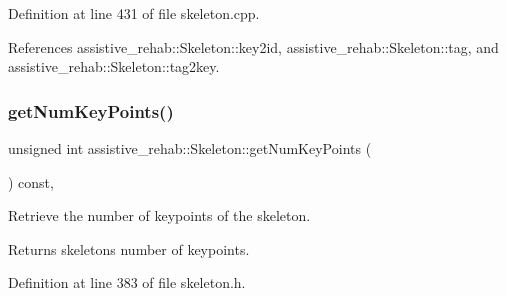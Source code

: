 Definition at line 431 of file skeleton.\+cpp.


\begin{DoxyCode}{0}

\end{DoxyCode}


References assistive\+\_\+rehab\+::\+Skeleton\+::key2id, assistive\+\_\+rehab\+::\+Skeleton\+::tag, and assistive\+\_\+rehab\+::\+Skeleton\+::tag2key.

\mbox{\label{classassistive__rehab_1_1Skeleton_ac5e5b98f2c9178f6e0def5033e27922f}} 
\subsubsection{\texorpdfstring{getNumKeyPoints()}{getNumKeyPoints()}}
{\footnotesize\ttfamily unsigned int assistive\+\_\+rehab\+::\+Skeleton\+::get\+Num\+Key\+Points (\begin{DoxyParamCaption}{ }\end{DoxyParamCaption}) const\hspace{0.3cm}{\ttfamily [inline]}, {\ttfamily [inherited]}}



Retrieve the number of keypoints of the skeleton. 

\begin{DoxyReturn}{Returns}
skeleton\textquotesingle{}s number of keypoints. 
\end{DoxyReturn}


Definition at line 383 of file skeleton.\+h.


\begin{DoxyCode}{0}

\end{DoxyCode}


